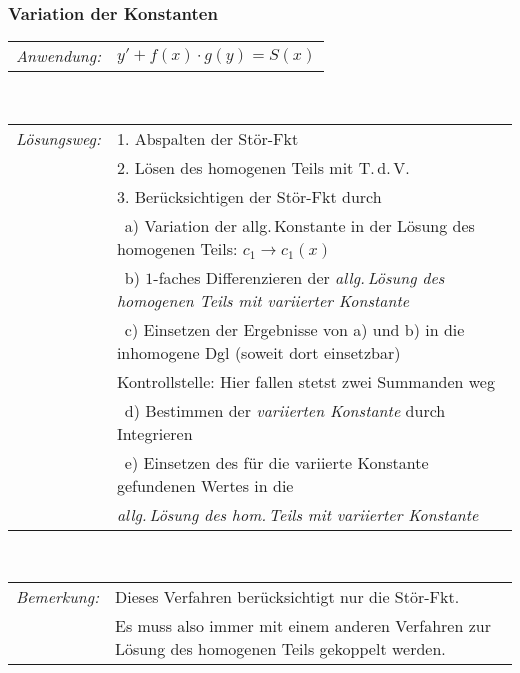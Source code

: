 \documentclass[a4paper,10pt,titlepage]{scrartcl}
\begin{document}
\subsubsection*{Variation der Konstanten}
\begin{tabular}{ll}
 \emph{Anwendung:}
 & $y'+f(x)\cdot g(y)=S(x)$
 \\
\end{tabular}
\smallskip\\
\begin{tabular}{ll}
 \emph{Lösungsweg:}
 & 1. Abspalten der Stör-Fkt\\
 & 2. Lösen des homogenen Teils mit T.\,d.\,V.\\
 & 3. Berücksichtigen der Stör-Fkt durch\\
 & \quad\, a) Variation der allg.\,Konstante in der Lösung des homogenen Teils: $c_1\to c_1(x)$\\
 & \quad\, b) $1$-faches Differenzieren der \emph{allg.\,Lösung des homogenen Teils mit variierter Konstante}\\
 & \quad\, c) Einsetzen der Ergebnisse von a) und b) in die inhomogene Dgl (soweit dort einsetzbar)\\
 & \qquad\;   Kontrollstelle: Hier fallen stetst zwei Summanden weg\\
 & \quad\, d) Bestimmen der \emph{variierten Konstante} durch Integrieren \\%
 & \quad\, e) Einsetzen des für die variierte Konstante gefundenen Wertes in die\\
 & \qquad\;   \emph{allg.\,Lösung des hom.\,Teils mit variierter Konstante} \\%
\end{tabular}
\medskip\\
\begin{tabular}{ll}
 \emph{Bemerkung:} & Dieses Verfahren berücksichtigt nur die Stör-Fkt.\\
 & Es muss also immer mit einem anderen Verfahren zur Lösung des homogenen Teils gekoppelt werden.\\
\end{tabular}
\end{document}
